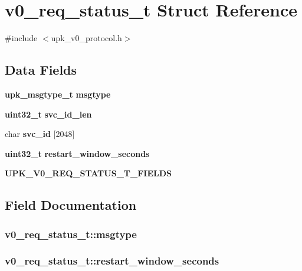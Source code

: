 \section{v0\_\-req\_\-status\_\-t Struct Reference}
\label{structv0__req__status__t}


{\ttfamily \#include $<$upk\_\-v0\_\-protocol.h$>$}

\subsection*{Data Fields}
\begin{DoxyCompactItemize}
\item 
{\bf upk\_\-msgtype\_\-t} {\bf msgtype}
\item 
{\bf uint32\_\-t} {\bf svc\_\-id\_\-len}
\item 
char {\bf svc\_\-id} [2048]
\item 
{\bf uint32\_\-t} {\bf restart\_\-window\_\-seconds}
\item 
{\bf UPK\_\-V0\_\-REQ\_\-STATUS\_\-T\_\-FIELDS}
\end{DoxyCompactItemize}


\subsection{Field Documentation}
\subsubsection[{msgtype}]{ {\bf v0\_\-req\_\-status\_\-t::msgtype}}\label{structv0__req__status__t_a61a37ef5b652a10d5f8e4afc6827b09e}
\subsubsection[{restart\_\-window\_\-seconds}]{ {\bf v0\_\-req\_\-status\_\-t::restart\_\-window\_\-seconds}}\label{structv0__req__status__t_a0f15404b6fb80cfb510983ea249769a5}
